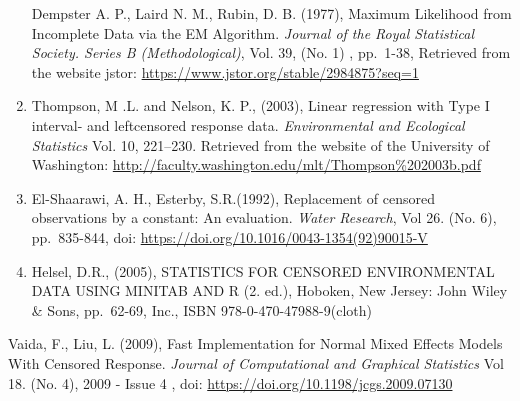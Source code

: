 \documentclass[]{article}
\begin{document}
\begin{enumerate}
  Dempster A. P., Laird N. M., Rubin, D. B. (1977), Maximum Likelihood
  from Incomplete Data via the EM Algorithm. \emph{Journal of the Royal
  Statistical Society. Series B (Methodological)}, Vol. 39, (No. 1) ,
  pp.~1-38, Retrieved from the website jstor:
  \url{https://www.jstor.org/stable/2984875?seq=1}
\item
  Thompson, M .L. and Nelson, K. P., (2003), Linear regression with Type
  I interval- and leftcensored response data. \emph{Environmental and
  Ecological Statistics} Vol. 10, 221--230. Retrieved from the website
  of the University of Washington:
  \url{http://faculty.washington.edu/mlt/Thompson\%202003b.pdf}
\item
  El-Shaarawi, A. H., Esterby, S.R.(1992), Replacement of censored
  observations by a constant: An evaluation. \emph{Water Research}, Vol
  26. (No. 6), pp.~835-844, doi:
  \url{https://doi.org/10.1016/0043-1354(92)90015-V}
\item
  Helsel, D.R., (2005), STATISTICS FOR CENSORED ENVIRONMENTAL DATA USING
  MINITAB AND R (2. ed.), Hoboken, New Jersey: John Wiley \& Sons,
  pp.~62-69, Inc., ISBN 978-0-470-47988-9(cloth)
\end{enumerate}

Vaida, F., Liu, L. (2009), Fast Implementation for Normal Mixed Effects
Models With Censored Response. \emph{Journal of Computational and
Graphical Statistics} Vol 18. (No. 4), 2009 - Issue 4 , doi:
\url{https://doi.org/10.1198/jcgs.2009.07130}
\end{document}

